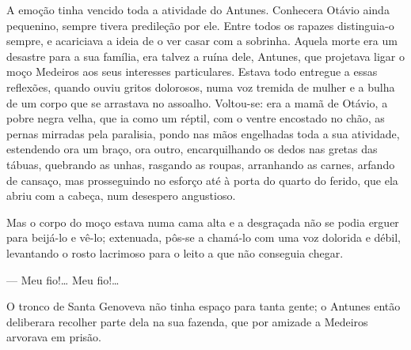 {A emoção tinha vencido toda a atividade do Antunes.
Conhecera Otávio ainda pequenino, sempre tivera
predileção por ele. Entre todos os rapazes distinguia-o sempre, e
acariciava a ideia de o ver casar com a sobrinha. Aquela morte
era um desastre para a sua família, era talvez a ruína
dele, Antunes, que projetava ligar o moço Medeiros aos seus interesses
particulares. Estava todo entregue a essas reflexões, quando ouviu
gritos dolorosos, numa voz tremida de mulher e a bulha de um corpo que
se arrastava no assoalho. \label{Ref1} Voltou-se: era a mamã de Otávio, a
pobre negra velha, que ia como um réptil, com o ventre
encostado no chão, as pernas mirradas pela paralisia, pondo nas mãos
engelhadas toda a sua atividade, estendendo ora um braço, ora outro,
encarquilhando os dedos nas gretas das tábuas, quebrando as unhas,
rasgando as roupas, arranhando as carnes, arfando de cansaço, mas
prosseguindo no esforço até à porta do quarto do ferido, que
ela abriu com a cabeça, num desespero angustioso.

Mas o corpo do moço estava numa cama alta e a desgraçada não se
 podia erguer para beijá-lo e vê-lo; extenuada, pôs-se
 a chamá-lo com uma voz dolorida e débil, levantando o rosto
 lacrimoso para o leito a que não conseguia chegar. \label{ref10}

--- Meu fio!\ldots{} Meu fio!\ldots{}



O tronco de Santa Genoveva não tinha espaço para tanta gente; o
Antunes então deliberara recolher parte dela na sua fazenda, que por
amizade a Medeiros arvorava em prisão.

}
